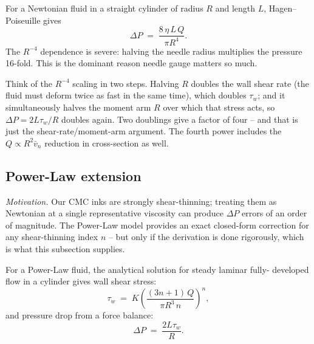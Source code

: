 \documentclass[11pt,a4paper]{article}
\begin{document}
For a Newtonian fluid in a straight cylinder of radius $R$ and length
$L$, Hagen--Poiseuille gives
\begin{equation}
\Delta P \;=\; \frac{8\,\eta\,L\,Q}{\pi R^4}.
\label{eq:HP_newton}
\end{equation}
The $R^{-4}$ dependence is severe: halving the needle radius multiplies
the pressure 16-fold. This is the dominant reason needle gauge matters
so much.

\begin{intuitionbox}
Think of the $R^{-4}$ scaling in two steps. Halving $R$ doubles the wall
shear rate (the fluid must deform twice as fast in the same time), which
doubles $\tau_w$; and it simultaneously halves the moment arm
$R$ over which that stress acts, so $\Delta P=2L\tau_w/R$ doubles again.
Two doublings give a factor of four -- and that is just the
shear-rate/moment-arm argument. The fourth power includes the $Q\propto
R^2\bar v_n$ reduction in cross-section as well.
\end{intuitionbox}

\subsection{Power-Law extension}

\emph{Motivation.} Our CMC inks are strongly shear-thinning; treating them
as Newtonian at a single representative viscosity can produce $\Delta P$
errors of an order of magnitude. The Power-Law model provides an exact
closed-form correction for any shear-thinning index $n$ -- but only if the
derivation is done rigorously, which is what this subsection supplies.

For a Power-Law fluid, the analytical solution for steady laminar fully-
developed flow in a cylinder gives wall shear stress:
\begin{equation}
\tau_w \;=\; K\!\left(\frac{(3n+1)\,Q}{\pi R^3\, n}\right)^{\!n},
\label{eq:tau_w_PL}
\end{equation}
and pressure drop from a force balance:
\begin{equation}
\Delta P \;=\; \frac{2 L \tau_w}{R}.
\label{eq:HP_PL}
\end{equation}
\end{document}

